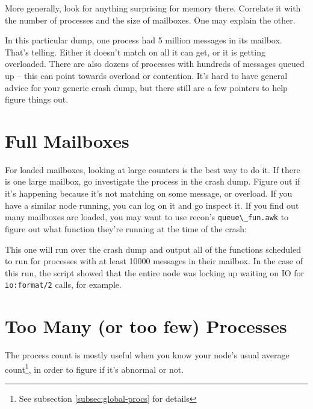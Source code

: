 \documentclass[11pt, oneside]{book}   	%
\newcommand{\app}[1]{\Verb`#1`}
\newcommand{\function}[1]{\Verb`#1`}
\begin{document}
More generally, look for anything surprising for memory there. Correlate it with the number of processes and the size of mailboxes. One may explain the other. 

In this particular dump, one process had 5 million messages in its mailbox. That's telling. Either it doesn't match on all it can get, or it is getting overloaded. There are also dozens of processes with hundreds of messages queued up -- this can point towards overload or contention. It's hard to have general advice for your generic crash dump, but there still are a few pointers to help figure things out.

\section{Full Mailboxes}

For loaded mailboxes, looking at large counters is the best way to do it. If there is one large mailbox, go investigate the process in the crash dump. Figure out if it's happening because it's not matching on some message, or overload. If you have a similar node running, you can log on it and go inspect it. If you find out many mailboxes are loaded, you may want to use recon's \app{queue\_fun.awk} to figure out what function they're running at the time of the crash:


This one will run over the crash dump and output all of the functions scheduled to run for processes with at least 10000 messages in their mailbox. In the case of this run, the script showed that the entire node was locking up waiting on IO for \function{io:format/2} calls, for example.

\section{Too Many (or too few) Processes}

The process count is mostly useful when you know your node's usual average count\footnote{See subsection \ref{subsec:global-procs} for details}, in order to figure if it's abnormal or not.
\end{document}

